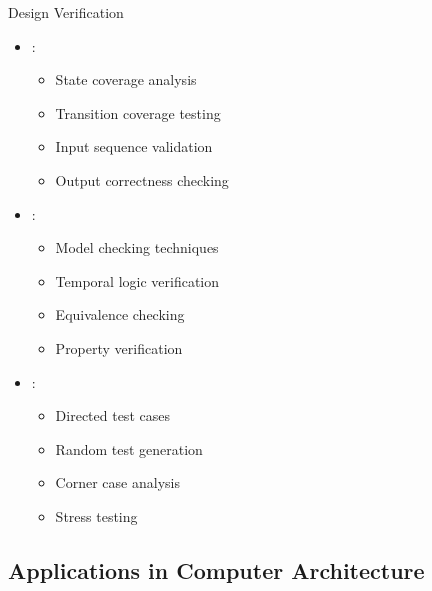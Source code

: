 \begin{frame}{Design Verification}
\begin{itemize}
\item {}:
\begin{itemize}
\item State coverage analysis
\item Transition coverage testing
\item Input sequence validation
\item Output correctness checking
\end{itemize}
\vspace{0.5cm}
\item {}:
\begin{itemize}
\item Model checking techniques
\item Temporal logic verification
\item Equivalence checking
\item Property verification
\end{itemize}
\vspace{0.3cm}
\item {}:
\begin{itemize}
\item Directed test cases
\item Random test generation
\item Corner case analysis
\item Stress testing
\end{itemize}
\end{itemize}
\end{frame}

\subsection{Applications in Computer Architecture}

